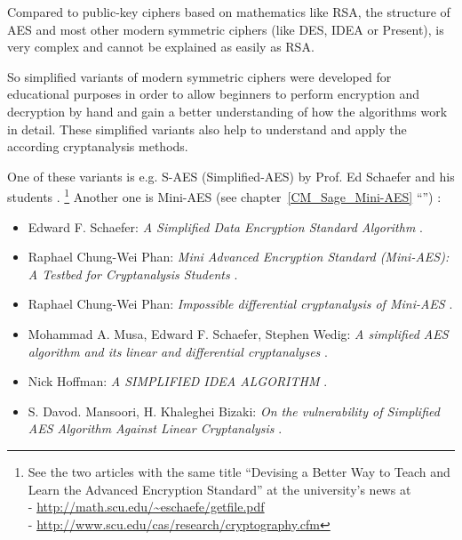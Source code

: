 Compared to public-key ciphers based on mathematics like RSA, the structure of AES and most other modern symmetric ciphers (like DES, IDEA or Present), is very complex and cannot be explained as easily as RSA.

So simplified variants of modern symmetric ciphers were developed for
educational purposes in order to allow beginners to perform
encryption and decryption by hand and gain a better understanding of how the
algorithms work in detail.
These simplified variants also help to understand and apply the according
cryptanalysis methods.

One of these variants is e.g. S-AES (Simplified-AES) by Prof. Ed Schaefer
and his students \cite{cm:Musa-etal2003}.%
\footnote{
    See the two articles with the same title
    ``Devising a Better Way to Teach and Learn the Advanced Encryption Standard''
    at the university's news at\\
    - \url{http://math.scu.edu/~eschaefe/getfile.pdf} \\
    - \url{http://www.scu.edu/cas/research/cryptography.cfm}
}
Another one is Mini-AES \cite{cm:Phan2002}
(see chapter~\ref{CM_Sage_Mini-AES} ``'')%
:
\begin{itemize}

\item Edward F. Schaefer: {\em A Simplified Data Encryption Standard Algorithm} 
      \cite{cm:Schaefer1996}.

\item Raphael Chung-Wei Phan: {\em Mini Advanced Encryption Standard (Mini-AES):
                                   A Testbed for Cryptanalysis Students} 
      \cite{cm:Phan2002}.

\item Raphael Chung-Wei Phan: {\em Impossible differential cryptanalysis of Mini-AES} 
      \cite{cm:Phan2003}.

\item Mohammad A. Musa, Edward F. Schaefer, Stephen Wedig:
      {\em A simplified AES algorithm and its linear and differential cryptanalyses} 
      \cite{cm:Musa-etal2003}.

\item Nick Hoffman: {\em A SIMPLIFIED IDEA ALGORITHM} 
      \cite{cm:Hoffman2006}.

\item S. Davod. Mansoori, H. Khaleghei Bizaki: 
      {\em On the vulnerability of Simplified AES Algorithm Against Linear Cryptanalysis} 
      \cite{cm:Mansoori-etal2007}.

\end{itemize}




